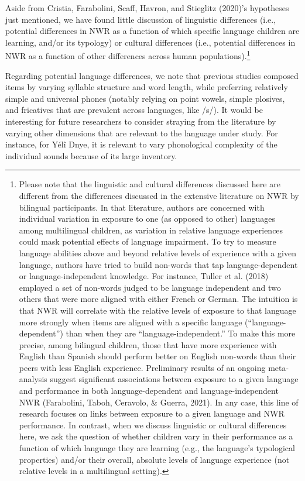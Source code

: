 \documentclass[
  american,
  ,man,floatsintext]{apa6}
\begin{document}
Aside from Cristia, Farabolini, Scaff, Havron, and Stieglitz (2020)'s hypotheses just mentioned, we have found little discussion of linguistic differences (i.e., potential differences in NWR as a function of which specific language children are learning, and/or its typology) or cultural differences (i.e., potential differences in NWR as a function of other differences across human populations).\footnote{Please note that the linguistic and cultural differences discussed here are different from the differences discussed in the extensive literature on NWR by bilingual participants. In that literature, authors are concerned with individual variation in exposure to one (as opposed to other) languages among multilingual children, as variation in relative language experiences could mask potential effects of language impairment. To try to measure language abilities above and beyond relative levels of experience with a given language, authors have tried to build non-words that tap language-dependent or language-independent knowledge. For instance, Tuller et al. (2018) employed a set of non-words judged to be language independent and two others that were more aligned with either French or German. The intuition is that NWR will correlate with the relative levels of exposure to that language more strongly when items are aligned with a specific language (``language-dependent'') than when they are ``language-independent.'' To make this more precise, among bilingual children, those that have more experience with English than Spanish should perform better on English non-words than their peers with less English experience. Preliminary results of an ongoing meta-analysis suggest significant associations between exposure to a given language and performance in both language-dependent and language-independent NWR (Farabolini, Taboh, Ceravolo, \& Guerra, 2021). In any case, this line of research focuses on links between exposure to a given language and NWR performance. In contrast, when we discuss linguistic or cultural differences here, we ask the question of whether children vary in their performance as a function of which language they are learning (e.g., the language's typological properties) and/or their overall, absolute levels of language experience (not relative levels in a multilingual setting).}

Regarding potential language differences, we note that previous studies composed items by varying syllable structure and word length, while preferring relatively simple and universal phones (notably relying on point vowels, simple plosives, and fricatives that are prevalent across languages, like /s/). It would be interesting for future researchers to consider straying from the literature by varying other dimensions that are relevant to the language under study. For instance, for Yélî Dnye, it is relevant to vary phonological complexity of the individual sounds because of its large inventory.
\end{document}
